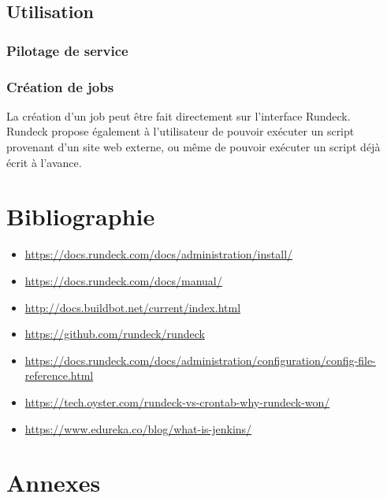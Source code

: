 \documentclass[12pt]{article}
\begin{document}
\subsection{Utilisation}
\subsubsection{Pilotage de service}
\subsubsection{Création de jobs}
La création d'un job peut être fait directement sur l'interface Rundeck. 
\\
Rundeck propose également à l'utilisateur de pouvoir exécuter un script provenant d'un site web externe, ou même de pouvoir exécuter un script déjà écrit à l'avance. 

\newpage
\section{Bibliographie}

\begin{itemize}
    \item \url{https://docs.rundeck.com/docs/administration/install/}
    \item \url{https://docs.rundeck.com/docs/manual/}
    \item \url{http://docs.buildbot.net/current/index.html}
    \item \url{https://github.com/rundeck/rundeck}
    \item \url{https://docs.rundeck.com/docs/administration/configuration/config-file-reference.html}
    \item \url{https://tech.oyster.com/rundeck-vs-crontab-why-rundeck-won/}
    \item \url{https://www.edureka.co/blog/what-is-jenkins/}
\end{itemize}

\newpage
\section{Annexes}
\end{document}
